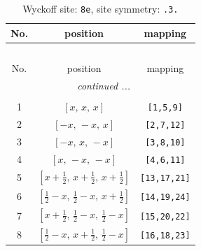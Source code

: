 \documentclass[fleqn,8pt]{jsarticle}
\begin{document}
\renewcommand{\arraystretch}{1.2}
\begin{longtable}{ccc}
\caption{Wyckoff site: {\tt 8e}, site symmetry: {\tt .3.}}
 \\
 \hline \hline
No. & position & mapping \\ \hline \endfirsthead

\multicolumn{2}{l}{\tablename\ \thetable{}} \\
 \hline \hline
No. & position & mapping \\ \hline \endhead

 \hline \hline
\multicolumn{2}{r}{\footnotesize\it continued ...} \\ \endfoot

 \hline \hline
\multicolumn{2}{r}{} \\ \endlastfoot

1 & $\left[ x,\, x,\, x \right]$ & {\tt [1,5,9]} \\ \hline
2 & $\left[ - x,\, - x,\, x \right]$ & {\tt [2,7,12]} \\ \hline
3 & $\left[ - x,\, x,\, - x \right]$ & {\tt [3,8,10]} \\ \hline
4 & $\left[ x,\, - x,\, - x \right]$ & {\tt [4,6,11]} \\ \hline
5 & $\left[ x + \frac{1}{2},\, x + \frac{1}{2},\, x + \frac{1}{2} \right]$ & {\tt [13,17,21]} \\ \hline
6 & $\left[ \frac{1}{2} - x,\, \frac{1}{2} - x,\, x + \frac{1}{2} \right]$ & {\tt [14,19,24]} \\ \hline
7 & $\left[ x + \frac{1}{2},\, \frac{1}{2} - x,\, \frac{1}{2} - x \right]$ & {\tt [15,20,22]} \\ \hline
8 & $\left[ \frac{1}{2} - x,\, x + \frac{1}{2},\, \frac{1}{2} - x \right]$ & {\tt [16,18,23]} \\
\end{longtable}
\renewcommand{\arraystretch}{1.2}
\end{document}
